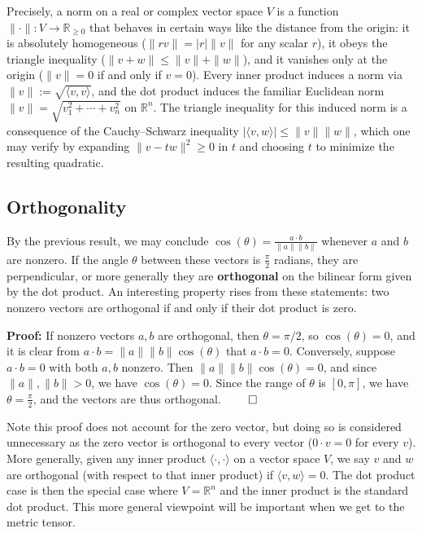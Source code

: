 \documentclass{article}
\begin{document}
Precisely, a norm on a real or complex vector space $V$ is a function $\|\cdot\| : V \to \mathbb{R}_{\geq 0}$ that behaves in certain ways like the distance from the origin: it is absolutely homogeneous ($\|rv\| = |r| \|v\|$ for any scalar $r$), it obeys the triangle inequality ($\|v + w\| \leq \|v\| + \|w\|$), and it vanishes only at the origin ($\|v\| = 0$ if and only if $v = 0$). Every inner product induces a norm via $\|v\| := \sqrt{\langle v, v \rangle}$, and the dot product induces the familiar Euclidean norm $\|v\| = \sqrt{v_1^2 + \cdots + v_n^2}$ on $\mathbb{R}^n$. The triangle inequality for this induced norm is a consequence of the Cauchy--Schwarz inequality $|\langle v, w \rangle| \leq \|v\|\|w\|$, which one may verify by expanding $\|v - t w\|^2 \geq 0$ in $t$ and choosing $t$ to minimize the resulting quadratic.

\subsection{Orthogonality}
By the previous result, we may conclude $\cos(\theta) = \frac{a \cdot b}{\|a\|\|b\|}$ whenever $a$ and $b$ are nonzero. If the angle $\theta$ between these vectors is $\frac{\pi}{2}$ radians, they are perpendicular, or more generally they are \textbf{orthogonal} on the bilinear form given by the dot product. An interesting property rises from these statements: two nonzero vectors are orthogonal if and only if their dot product is zero. 

\textbf{Proof:} If nonzero vectors $a, b$ are orthogonal, then $\theta = \pi/2$, so $\cos(\theta) = 0$, and it is clear from $a \cdot b = \|a\| \|b\| \cos(\theta)$ that $a \cdot b = 0$. Conversely, suppose $a \cdot b = 0$ with both $a, b$ nonzero. Then $\|a\| \|b\| \cos(\theta) = 0$, and since $\|a\|, \|b\| > 0$, we have $\cos(\theta) = 0$. Since the range of $\theta$ is $[0, \pi]$, we have $\theta = \frac{\pi}{2}$, and the vectors are thus orthogonal. $\qed$

Note this proof does not account for the zero vector, but doing so is considered unnecessary as the zero vector is orthogonal to every vector ($0 \cdot v = 0$ for every $v$). More generally, given any inner product $\langle \cdot, \cdot \rangle$ on a vector space $V$, we say $v$ and $w$ are orthogonal (with respect to that inner product) if $\langle v, w \rangle = 0$. The dot product case is then the special case where $V = \mathbb{R}^n$ and the inner product is the standard dot product. This more general viewpoint will be important when we get to the metric tensor.
\end{document}
